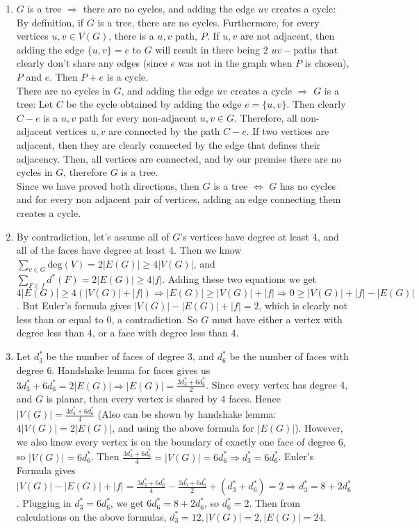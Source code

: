 \documentclass[10pt,english]{article}
\begin{document}
\begin{enumerate}
\item $G$ is a tree $\Rightarrow$ there are no cycles, and adding the edge $uv$ creates a cycle: By definition, if $G$ is a tree, there are no cycles. Furthermore, for every vertices $u,v\in V(G)$, there is a $u,v$ path, $P$. If $u,v$ are not adjacent, then adding the edge $\{u,v\}=e$ to $G$ will result in there being $2$ $uv-$paths that clearly don't share any edges (since $e$ was not in the graph when $P$ is chosen), $P$ and $e$. Then $P+e$ is a cycle. \\
There are no cycles in $G$, and adding the edge $uv$ creates a cycle $\Rightarrow$ $G$ is a tree: Let $C$ be the cycle obtained by adding the edge $e=\{u,v\}$. Then clearly $C-e$ is a $u,v$ path for every non-adjacent $u,v\in G$. Therefore, all non-adjacent vertices $u,v$ are connected by the path $C-e$. If two vertices are adjacent, then they are clearly connected by the edge that defines their adjacency. Then, all vertices are connected, and by our premise there are no cycles in $G$, therefore $G$ is a tree.\\
Since we have proved both directions, then $G$ is a tree $\Leftrightarrow$ $G$ has no cycles and for every non adjacent pair of vertices, adding an edge connecting them creates a cycle. 


\item By contradiction, let's assume all of $G$'s vertices have degree at least 4, and all of the faces have degree at least 4. Then we know $\sum_{v\in G}\text{deg}(V)=2|E(G)|\geq 4|V(G)|$, and $\sum_{F\in f}d^*(F)=2|E(G)|\geq 4|f|$. Adding these two equations we get $4|E(G)|\geq 4(|V(G)|+|f|)\Rightarrow |E(G)|\geq |V(G)|+|f|\Rightarrow 0\geq |V(G)|+|f|-|E(G)|$. But Euler's formula gives $|V(G)|-|E(G)|+|f|=2$, which is clearly not less than or equal to 0, a contradiction. So $G$ must have either a vertex with degree less than 4, or a face with degree less than 4. 


\item Let $d^*_3$ be the number of faces of degree 3, and $d^*_6$ be the number of faces with degree 6. Handshake lemma for faces gives us $3d^*_3+6d^*_6=2|E(G)|\Rightarrow |E(G)|=\frac{3d^*_3+6d^*_6}{2}$. Since every vertex has degree 4, and $G$ is planar, then every vertex is shared by 4 faces. Hence $|V(G)|=\frac{3d^*_3+6d^*_6}{4}$ (Also can be shown by handshake lemma: $4|V(G)|=2|E(G)|$, and using the above formula for $|E(G)|$). However, we also know every vertex is on the boundary of exactly one face of degree 6, so $|V(G)|=6d^*_6$. Then $\frac{3d^*_3+6d^*_6}{4}=|V(G)|=6d^*_6\Rightarrow d_3^*=6d^*_6$. Euler's Formula gives $|V(G)|-|E(G)|+|f|=\frac{3d^*_3+6d^*_6}{4}-\frac{3d^*_3+6d^*_6}{2}+(d^*_3+d^*_6)=2\Rightarrow d^*_3=8+2d^*_6$. Plugging in $d_3^*=6d^*_6$, we get $6d^*_6=8+2d^*_6$, so $d^*_6=2$. Then from calculations on the above formulas, $d^*_3=12, |V(G)|=2, |E(G)|=24$.  


\end{enumerate}
\end{document}
